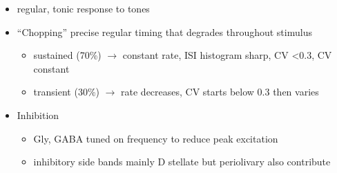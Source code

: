 \begin{itemize}
\item regular, tonic response to tones \citep{RhodeOertelEtAl:1983,SmithRhode:1989,BlackburnSachs:1989}
\item ``Chopping'' precise regular timing that degrades throughout stimulus\citep{YoungRobertEtAl:1988,BlackburnSachs:1989}
\begin{itemize}
\item sustained (70\%) $\rightarrow$ constant rate, ISI histogram sharp, CV \textless 0.3, CV constant
\item transient (30\%) $\rightarrow$ rate decreases, CV starts below 0.3 then varies
\end{itemize}
\item Inhibition
\begin{itemize}
\item Gly, GABA tuned on frequency to reduce peak excitation \citep{CasparyBackoffEtAl:1994}
\item inhibitory side bands mainly D stellate \citep{FerragamoGoldingEtAl:1998a} but periolivary also contribute \citep{AdamsWarr:1976,Adams:1983,ShoreHelfertEtAl:1991,OstapoffBensonEtAl:1997}
\end{itemize}
\end{itemize}
\citep{PalombiCaspary:1992,RhodeSmith:1986,NelkenYoung:1994,PaoliniClareyEtAl:2005,PaoliniClareyEtAl:2004}  

